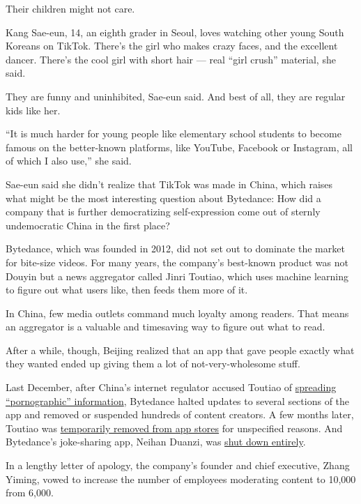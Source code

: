 Their children might not care.

Kang Sae-eun, 14, an eighth grader in Seoul, loves watching other young
South Koreans on TikTok. There's the girl who makes crazy faces, and the
excellent dancer. There's the cool girl with short hair --- real ``girl
crush'' material, she said.

They are funny and uninhibited, Sae-eun said. And best of all, they are
regular kids like her.

``It is much harder for young people like elementary school students to
become famous on the better-known platforms, like YouTube, Facebook or
Instagram, all of which I also use,'' she said.

Sae-eun said she didn't realize that TikTok was made in China, which
raises what might be the most interesting question about Bytedance: How
did a company that is further democratizing self-expression come out of
sternly undemocratic China in the first place?

Bytedance, which was founded in 2012, did not set out to dominate the
market for bite-size videos. For many years, the company's best-known
product was not Douyin but a news aggregator called Jinri Toutiao, which
uses machine learning to figure out what users like, then feeds them
more of it.

In China, few media outlets command much loyalty among readers. That
means an aggregator is a valuable and timesaving way to figure out what
to read.

After a while, though, Beijing realized that an app that gave people
exactly what they wanted ended up giving them a lot of
not-very-wholesome stuff.

Last December, after China's internet regulator accused Toutiao of
\href{https://www.nytimes.com/2018/01/02/business/china-toutiao-censorship.html}{spreading
``pornographic'' information}, Bytedance halted updates to several
sections of the app and removed or suspended hundreds of content
creators. A few months later, Toutiao was
\href{https://www.nytimes.com/2018/04/11/technology/china-toutiao-bytedance-censor.html}{temporarily
removed from app stores} for unspecified reasons. And Bytedance's
joke-sharing app, Neihan Duanzi, was
\href{https://www.nytimes.com/2018/04/12/business/china-bytedance-duanzi-censor.html}{shut
down entirely}.

In a lengthy letter of apology, the company's founder and chief
executive, Zhang Yiming, vowed to increase the number of employees
moderating content to 10,000 from 6,000.

